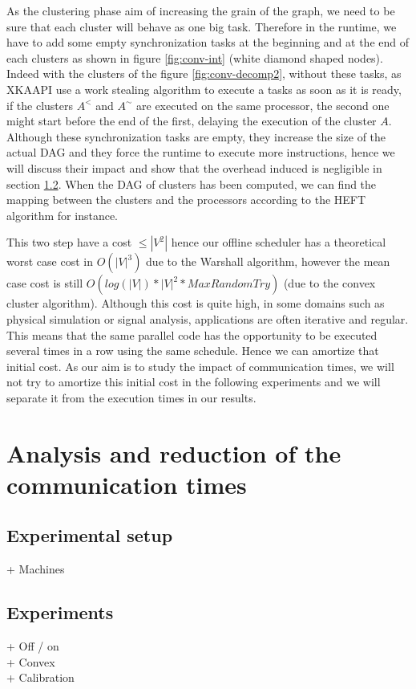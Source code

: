 \documentclass[10pt, conference, compsocconf,pdftex,dvipsnames]{IEEEtran}
\newcommand{\mytodo}[1]{\todo[inline]{#1}}
\begin{document}
As the clustering phase aim of increasing the grain of the graph, we need to
be sure that each cluster will behave as one big task. Therefore in the
runtime, we have to add some empty synchronization tasks at the beginning and
at the end of each clusters as shown in figure \ref{fig:conv-int} (white
diamond shaped nodes). Indeed with the clusters of the figure
\ref{fig:conv-decomp2}, without these tasks,  as XKAAPI use a work stealing
algorithm to execute a tasks as soon as it is ready, if the clusters $A^<$ and
$A^{\sim}$ are executed on the same processor, the second one might start
before the end of the first, delaying the execution of the cluster $A$.
Although these synchronization tasks are empty, they increase the size of the
actual DAG and they force the runtime to execute more instructions, hence we
will discuss their impact and show that the overhead induced is negligible in
section \ref{sec:exp-exp}. When the DAG of
clusters has been computed, we can find the mapping between the clusters and
the processors according to the HEFT algorithm for instance. 

This two step have a cost $\leq |V^2|$ hence our offline scheduler has a
theoretical worst case cost in $O(|V|^3)$ due to the Warshall algorithm,
however the mean case cost is still $O(log(|V|)*|V|^2*MaxRandomTry)$ (due to
the convex cluster algorithm).  Although this cost is quite high, in some
domains such as physical simulation or signal analysis, applications are often
iterative and regular. This means that the same parallel code has the
opportunity to be executed several times in a row using the same schedule.
Hence we can amortize that initial cost. As our aim is to study the impact of
communication times, we will not try to amortize this initial cost in the
following experiments and we will separate it from the execution times in our
results.

\section{Analysis and reduction of the communication times}
\label{sec:exp}
\mytodo{Continue here}
\subsection{Experimental setup}
\label{sec:exp-set}
+ Machines
\subsection{Experiments}
\label{sec:exp-exp}
+ Off / on
\\
+ Convex
\\
+ Calibration
\end{document}
